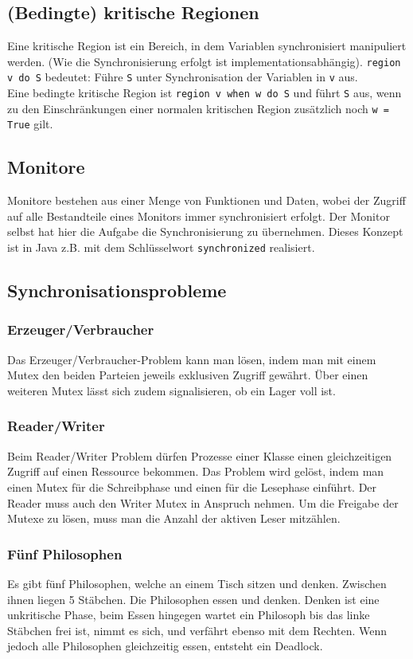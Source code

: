 \documentclass[11pt]{scrartcl}
\begin{document}
\subsection{(Bedingte) kritische Regionen}
Eine kritische Region ist ein Bereich, in dem Variablen synchronisiert manipuliert werden. (Wie die Synchronisierung erfolgt ist implementationsabhängig). \texttt{region v do S} bedeutet: Führe \texttt{S} unter Synchronisation der Variablen in \texttt{v} aus.\\

Eine bedingte kritische Region ist \texttt{region v when w do S} und führt \texttt{S} aus, wenn zu den Einschränkungen einer normalen kritischen Region zusätzlich noch \texttt{w = True} gilt.

\subsection{Monitore}
Monitore bestehen aus einer Menge von Funktionen und Daten, wobei der Zugriff auf alle Bestandteile eines Monitors immer synchronisiert erfolgt. Der Monitor selbst hat hier die Aufgabe die Synchronisierung zu übernehmen. Dieses Konzept ist in Java z.B. mit dem Schlüsselwort \texttt{synchronized} realisiert.

\subsection{Synchronisationsprobleme}
\subsubsection{Erzeuger/Verbraucher}
Das Erzeuger/Verbraucher-Problem kann man lösen, indem man mit einem Mutex den beiden Parteien jeweils exklusiven Zugriff gewährt. Über einen weiteren Mutex lässt sich zudem signalisieren, ob ein Lager voll ist.

\subsubsection{Reader/Writer}
Beim Reader/Writer Problem dürfen Prozesse einer Klasse einen gleichzeitigen Zugriff auf einen Ressource bekommen. Das Problem wird gelöst, indem man einen Mutex für die Schreibphase und einen für die Lesephase einführt. Der Reader muss auch den Writer Mutex in Anspruch nehmen. Um die Freigabe der Mutexe zu lösen, muss man die Anzahl der aktiven Leser mitzählen.

\subsubsection{Fünf Philosophen}
Es gibt fünf Philosophen, welche an einem Tisch sitzen und denken. Zwischen ihnen liegen 5 Stäbchen. Die Philosophen essen und denken. Denken ist eine unkritische Phase, beim Essen hingegen wartet ein Philosoph bis das linke Stäbchen frei ist, nimmt es sich, und verfährt ebenso mit dem Rechten. Wenn jedoch alle Philosophen gleichzeitig essen, entsteht ein Deadlock.
\end{document}
